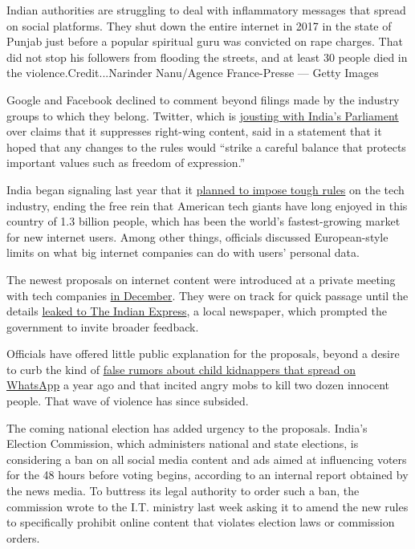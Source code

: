 Indian authorities are struggling to deal with inflammatory messages
that spread on social platforms. They shut down the entire internet in
2017 in the state of Punjab just before a popular spiritual guru was
convicted on rape charges. That did not stop his followers from flooding
the streets, and at least 30 people died in the
violence.Credit...Narinder Nanu/Agence France-Presse --- Getty Images

Google and Facebook declined to comment beyond filings made by the
industry groups to which they belong. Twitter, which is
\href{https://economictimes.indiatimes.com/tech/internet/house-panel-gives-twitter-15-days-to-present-ceo-jack-dorsey/articleshow/67951655.cms}{jousting
with India's Parliament} over claims that it suppresses right-wing
content, said in a statement that it hoped that any changes to the rules
would ``strike a careful balance that protects important values such as
freedom of expression.''

India began signaling last year that it
\href{https://www.nytimes.com/2018/08/31/technology/india-technology-american-giants.html}{planned
to impose tough rules} on the tech industry, ending the free rein that
American tech giants have long enjoyed in this country of 1.3 billion
people, which has been the world's fastest-growing market for new
internet users. Among other things, officials discussed European-style
limits on what big internet companies can do with users' personal data.

The newest proposals on internet content were introduced at a private
meeting with tech companies
\href{https://meity.gov.in/content/comments-suggestions-invited-draft-\%E2\%80\%9C-information-technology-intermediary-guidelines}{in
December}. They were on track for quick passage until the details
\href{https://indianexpress.com/article/india/it-act-amendments-data-privacy-freedom-of-speech-fb-twitter-5506572/}{leaked
to The Indian Express}, a local newspaper, which prompted the government
to invite broader feedback.

Officials have offered little public explanation for the proposals,
beyond a desire to curb the kind of
\href{https://www.nytimes.com/interactive/2018/11/23/technology/whatsapp-india-killings-ES.html}{false
rumors about child kidnappers that spread on WhatsApp} a year ago and
that incited angry mobs to kill two dozen innocent people. That wave of
violence has since subsided.

The coming national election has added urgency to the proposals. India's
Election Commission, which administers national and state elections, is
considering a ban on all social media content and ads aimed at
influencing voters for the 48 hours before voting begins, according to
an internal report obtained by the news media. To buttress its legal
authority to order such a ban, the commission wrote to the I.T. ministry
last week asking it to amend the new rules to specifically prohibit
online content that violates election laws or commission orders.

